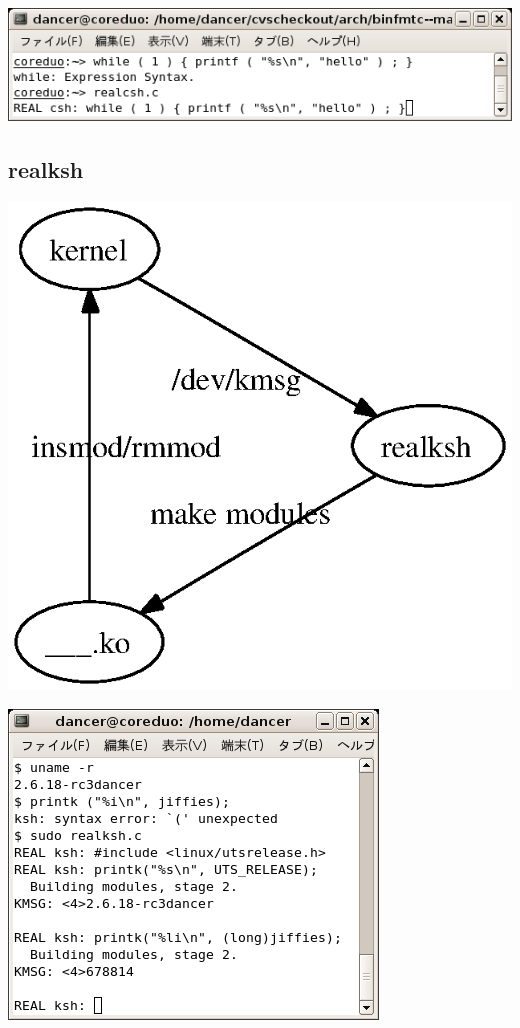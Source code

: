 \documentclass[cjk,dvipdfm]{beamer}
\begin{document}
\begin{frame}
\includegraphics[width=1.0\hsize]{image200609/realcsh-while.png}
\end{frame}

\subsection{realksh}
\begin{frame}
\includegraphics[width=0.5\hsize]{image200609/structure.eps}
\end{frame}

\begin{frame}
\includegraphics[width=0.8\hsize]{image200609/realksh-demo.png}
\end{frame}
\end{document}
